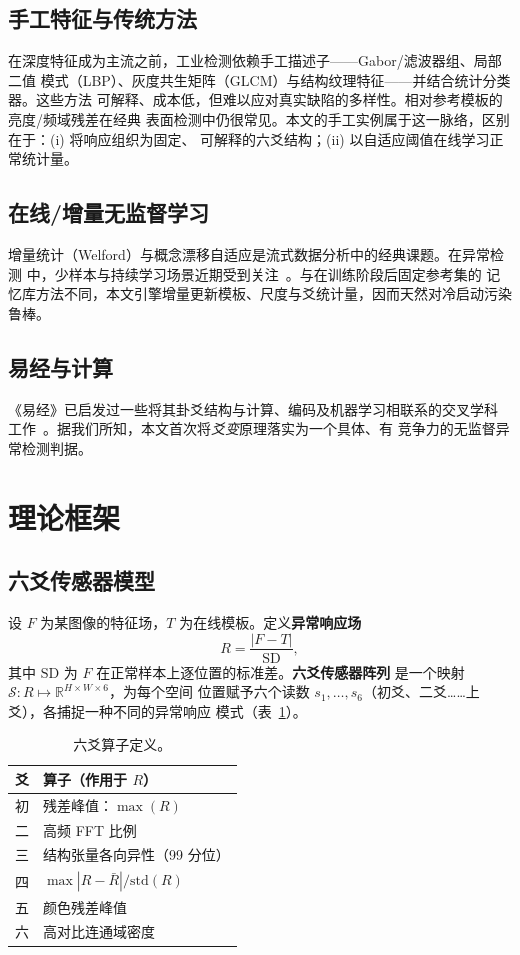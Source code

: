 \documentclass[journal,10pt]{IEEEtran}
\begin{document}
\subsection{手工特征与传统方法}
在深度特征成为主流之前，工业检测依赖手工描述子——Gabor/滤波器组、局部二值
模式（LBP）、灰度共生矩阵（GLCM）与结构纹理特征——并结合统计分类器。这些方法
可解释、成本低，但难以应对真实缺陷的多样性。相对参考模板的亮度/频域残差在经典
表面检测中仍很常见。本文的手工实例属于这一脉络，区别在于：(i) 将响应组织为固定、
可解释的六爻结构；(ii) 以自适应阈值在线学习正常统计量。

\subsection{在线/增量无监督学习}
增量统计（Welford）与概念漂移自适应是流式数据分析中的经典课题。在异常检测
中，少样本与持续学习场景近期受到关注~\cite{jeong2023winclip}。与在训练阶段后固定参考集的
记忆库方法不同，本文引擎增量更新模板、尺度与爻统计量，因而天然对冷启动污染
鲁棒。

\subsection{易经与计算}
《易经》已启发过一些将其卦爻结构与计算、编码及机器学习相联系的交叉学科
工作~\cite{zhang2020yijing}。据我们所知，本文首次将\emph{爻变}原理落实为一个具体、有
竞争力的无监督异常检测判据。

\section{理论框架}
\label{sec:framework}
\subsection{六爻传感器模型}
设 $F$ 为某图像的特征场，$T$ 为在线模板。定义\textbf{异常响应场}
\begin{equation}
R = \frac{|F - T|}{\mathrm{SD}},
\end{equation}
其中 $\mathrm{SD}$ 为 $F$ 在正常样本上逐位置的标准差。\textbf{六爻传感器阵列}
是一个映射 $\mathcal{S}: R \mapsto \mathbb{R}^{H\times W\times 6}$，为每个空间
位置赋予六个读数 $s_1,\dots,s_6$（初爻、二爻……上爻），各捕捉一种不同的异常响应
模式（表~\ref{tab:yao}）。

\begin{table}[t]
\centering
\caption{六爻算子定义。}
\label{tab:yao}
\begin{tabular}{cl}
\toprule
爻 & 算子（作用于 $R$） \\
\midrule
初 & 残差峰值：$\max(R)$ \\
二 & 高频 FFT 比例 \\
三 & 结构张量各向异性（99 分位） \\
四 & $\max|R-\bar R| / \mathrm{std}(R)$ \\
五 & 颜色残差峰值 \\
六 & 高对比连通域密度 \\
\bottomrule
\end{tabular}
\end{table}
\end{document}
